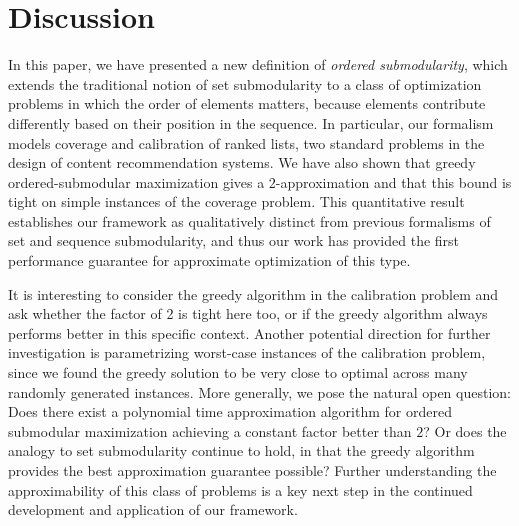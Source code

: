 
% 

\section{Discussion} \label{sec:discussion}

In this paper, we have presented a new definition of \emph{ordered submodularity}, which extends the traditional notion of set submodularity to a class of optimization problems in which the order of elements matters, because elements contribute differently based on their position in the sequence. In particular, our formalism models coverage and calibration of ranked lists, two standard problems in the design of content recommendation systems. We have also shown that greedy ordered-submodular maximization gives a $2$-approximation and that this bound is tight on simple instances of the coverage problem. This quantitative result establishes our framework as qualitatively distinct from previous formalisms of set and sequence submodularity, and thus our work has provided the first performance guarantee for approximate optimization of this type.

It is interesting to consider the greedy algorithm in the calibration problem and ask whether the factor of 2 is tight here too, or if the greedy algorithm always performs better in this specific context. Another potential direction for further investigation is parametrizing worst-case instances of the calibration problem, since we found the greedy solution to be very close to optimal across many randomly generated instances. More generally, we pose the natural open question: Does there exist a polynomial time approximation algorithm for ordered submodular maximization achieving a constant factor better than $2$? Or does the analogy to set submodularity continue to hold, in that the greedy algorithm provides the best approximation guarantee possible? Further understanding the approximability of this class of problems is a key next step in the continued development and application of our framework. 

% 